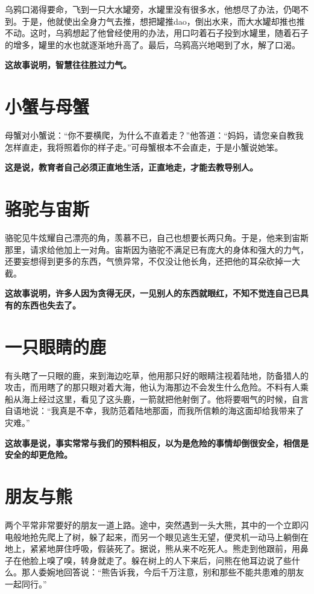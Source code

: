 乌鸦口渴得要命，飞到一只大水罐旁，水罐里没有很多水，他想尽了办法，仍喝不到。于是，他就使出全身力气去推，想把罐推dao，倒出水来，而大水罐却推也推不动。这时，乌鸦想起了他曾经使用的办法，用口叼着石子投到水罐里，随着石子的增多，罐里的水也就逐渐地升高了。最后，乌鸦高兴地喝到了水，解了口渴。

{\bfseries \color{red}这故事说明，智慧往往胜过力气。}

\section{小蟹与母蟹}

母蟹对小蟹说：“你不要横爬，为什么不直着走？”他答道：“妈妈，请您亲自教我怎样直走，我将照着你的样子走。”可母蟹根本不会直走，于是小蟹说她笨。

{\bfseries \color{red}这是说，教育者自己必须正直地生活，正直地走，才能去教导别人。}

\section{骆驼与宙斯}

骆驼见牛炫耀自己漂亮的角，羡慕不已，自己也想要长两只角。于是，他来到宙斯那里，请求给他加上一对角。宙斯因为骆驼不满足已有庞大的身体和强大的力气，还要妄想得到更多的东西，气愤异常，不仅没让他长角，还把他的耳朵砍掉一大截。

{\bfseries \color{red}这故事说明，许多人因为贪得无厌，一见别人的东西就眼红，不知不觉连自己已具有的东西也失去了。}

\section{一只眼睛的鹿}

有头瞎了一只眼的鹿，来到海边吃草，他用那只好的眼睛注视着陆地，防备猎人的攻击，而用瞎了的那只眼对着大海，他认为海那边不会发生什么危险。不料有人乘船从海上经过这里，看见了这头鹿，一箭就把他射倒了。他将要咽气的时候，自言自语地说：“我真是不幸，我防范着陆地那面，而我所信赖的海这面却给我带来了灾难。”

{\bfseries \color{red}这故事是说，事实常常与我们的预料相反，以为是危险的事情却倒很安全，相信是安全的却更危险。}

\section{朋友与熊}

两个平常非常要好的朋友一道上路。途中，突然遇到一头大熊，其中的一个立即闪电般地抢先爬上了树，躲了起来，而另一个眼见逃生无望，便灵机一动马上躺倒在地上，紧紧地屏住呼吸，假装死了。据说，熊从来不吃死人。熊走到他跟前，用鼻子在他脸上嗅了嗅，转身就走了。躲在树上的人下来后，问熊在他耳边说了些什么。那人委婉地回答说：“熊告诉我，今后千万注意，别和那些不能共患难的朋友一起同行。”

